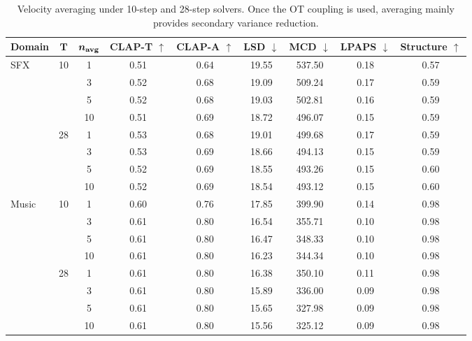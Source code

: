 \begin{table}[htpb]
    \centering
    \small
    \setlength{\tabcolsep}{4.5pt}
    \begin{tabular}{lcccccccc}
        \toprule
        \textbf{Domain} & $\boldsymbol{T}$ & $\boldsymbol{n_{\mathrm{avg}}}$ & \textbf{CLAP-T} $\uparrow$ & \textbf{CLAP-A} $\uparrow$ & \textbf{LSD} $\downarrow$ & \textbf{MCD} $\downarrow$ & \textbf{LPAPS} $\downarrow$ & \textbf{Structure} $\uparrow$ \\
        \midrule
        \multirow{8}{*}{SFX} & \multirow{4}{*}{10} & 1  & 0.51 & 0.64 & 19.55 & 537.50 & 0.18 & 0.57 \\
        & & 3  & 0.52 & 0.68 & 19.09 & 509.24 & 0.17 & 0.59 \\
        & & 5  & 0.52 & 0.68 & 19.03 & 502.81 & 0.16 & 0.59 \\
        & & 10 & 0.51 & 0.69 & 18.72 & 496.07 & 0.15 & 0.59 \\
        \cmidrule(l){2-9}
        & \multirow{4}{*}{28} & 1  & 0.53 & 0.68 & 19.01 & 499.68 & 0.17 & 0.59 \\
        & & 3  & 0.53 & 0.69 & 18.66 & 494.13 & 0.15 & 0.59 \\
        & & 5  & 0.52 & 0.69 & 18.55 & 493.26 & 0.15 & 0.60 \\
        & & 10 & 0.52 & 0.69 & 18.54 & 493.12 & 0.15 & 0.60 \\
        \midrule
        \multirow{8}{*}{Music} & \multirow{4}{*}{10} & 1  & 0.60 & 0.76 & 17.85 & 399.90 & 0.14 & 0.98 \\
        & & 3  & 0.61 & 0.80 & 16.54 & 355.71 & 0.10 & 0.98 \\
        & & 5  & 0.61 & 0.80 & 16.47 & 348.33 & 0.10 & 0.98 \\
        & & 10 & 0.61 & 0.80 & 16.23 & 344.34 & 0.10 & 0.98 \\
        \cmidrule(l){2-9}
        & \multirow{4}{*}{28} & 1  & 0.61 & 0.80 & 16.38 & 350.10 & 0.11 & 0.98 \\
        & & 3  & 0.61 & 0.80 & 15.89 & 336.00 & 0.09 & 0.98 \\
        & & 5  & 0.61 & 0.80 & 15.65 & 327.98 & 0.09 & 0.98 \\
        & & 10 & 0.61 & 0.80 & 15.56 & 325.12 & 0.09 & 0.98 \\
        \bottomrule
    \end{tabular}
    \caption{Velocity averaging under 10-step and 28-step solvers. Once the OT coupling is used, averaging mainly provides secondary variance reduction.}
    \label{tab:navg_app}
\end{table}

